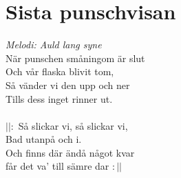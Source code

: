 \section{Sista punschvisan}
\textit{Melodi: Auld lang syne}
\vspace{2mm}\\
När punschen småningom är slut\\
Och vår flaska blivit tom,\\
Så vänder vi den upp och ner\\
Tills dess inget rinner ut.\\
\\
$||:$ Så slickar vi, så slickar vi,\\
Bad utanpå och i.\\
Och finns där ändå något kvar\\
får det va' till sämre dar $:||$\\
